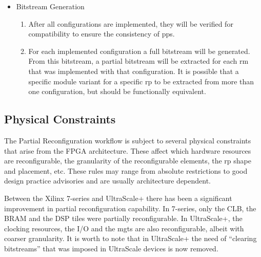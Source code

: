 \begin{itemize}
\begin{enumerate}
		reconfigurable domains. These sites will be locked and all subsequent
		\gls{rm} implementations will be constrained to respect them.
		Therefore the initial configuration must be chosen carefully,
		as a bad choice may render some \gls{rm} variants unroutable for some \glspl{rp}.
		It is recommended to begin with the configuration that contains the
		most difficult to route \gls{rm} variant of each \gls{rp}.
		In order to find a \gls{pp} set that permits the routing of all module variants,
		some trial and error is unavoidable.
	\item	All subsequent configurations import the static part of previous step
		and implement their \gls{rm} variants within its context.
	\end{enumerate}
\item	Bitstream Generation
	\begin{enumerate}
	\item	After all configurations are implemented, they will be verified for compatibility
		to ensure the consistency of \glspl{pp}.
	\item	For each implemented configuration a full bitstream will be generated.
		From this bitstream, a partial bitstream will be extracted for each \gls{rm}
		that was implemented with that configuration.
		It is possible that a specific module variant for a specific \gls{rp}
		to be extracted from more than one configuration,
		but should be functionally equivalent.
	\end{enumerate}
\end{itemize}

\subsection{Physical Constraints}
\label{sec:pr-phys}

The Partial Reconfiguration workflow is subject to several physical constraints that
arise from the FPGA architecture. These affect which hardware resources are reconfigurable,
the granularity of the reconfigurable elements, the \gls{rp} shape and placement, etc.
These rules may range from absolute restrictions to good design practice advisories
and are usually architecture dependent.

Between the Xilinx 7-series and UltraScale+ there has been a significant improvement
in partial reconfiguration capability. In 7-series, only the CLB, the BRAM and the DSP tiles
were partially reconfigurable. In UltraScale+, the clocking resources, the I/O and the
\glspl{mgt} are also reconfigurable, albeit with coarser granularity.
It is worth to note that in UltraScale+ the need of ``clearing bitstreams'' that
was imposed in UltraScale devices is now removed.

